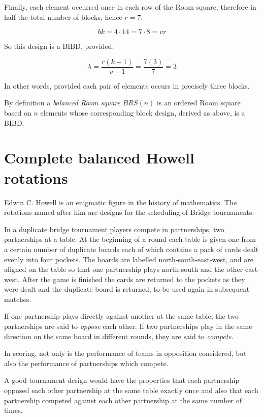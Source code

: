 \documentclass[
  11pt,
  a4paper]{book}
\begin{document}
Finally, each element occurred once in each row of the Room square,
therefore in half the total number of blocks, hence \(r = 7\).

\begin{equation}
bk = 4\cdot 14 = 7 \cdot 8 = vr
\end{equation}

So this design is a BIBD, provided:

\begin{equation}
\lambda = \frac{r(k - 1)}{v - 1} = \frac{7(3)}{7} = 3
\end{equation}

In other words, provided each pair of elements occurs in precisely three
blocks.

By definition a \emph{balanced Room square} \(BRS(n)\) is an ordered
Room square based on \(n\) elements whose corresponding block design,
derived as above, is a BIBD.

\hypertarget{complete-balanced-howell-rotations}{%
\section{Complete balanced Howell
rotations}\label{complete-balanced-howell-rotations}}

Edwin C. Howell is an enigmatic figure in the history of mathematics.
The rotations named after him are designs for the scheduling of Bridge
tournaments.

In a duplicate bridge tournament players compete in partnerships, two
partnerships at a table. At the beginning of a round each table is given
one from a certain number of duplicate boards each of which contains a
pack of cards dealt evenly into four pockets. The boards are labelled
north-south-east-west, and are aligned on the table so that one
partnership plays north-south and the other east-west. After the game is
finished the cards are returned to the pockets as they were dealt and
the duplicate board is returned, to be used again in subsequent matches.

If one partnership plays directly against another at the same table, the
two partnerships are said to \emph{oppose} each other. If two
partnerships play in the same direction on the same board in different
rounds, they are said to \emph{compete}.

In scoring, not only is the performance of teams in opposition
considered, but also the performance of partnerships which compete.

A good tournament design would have the properties that each partnership
opposed each other partnership at the same table exactly once and also
that each partnership competed against each other partnership at the
same number of times.
\end{document}
